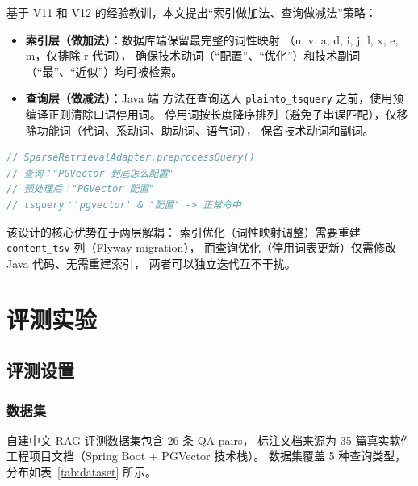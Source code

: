 \documentclass[a4paper, 12pt]{ctexart}
\begin{document}
基于 V11 和 V12 的经验教训，本文提出``索引做加法、查询做减法''策略：

\begin{itemize}
  \item \textbf{索引层（做加法）}：数据库端保留最完整的词性映射
  （n, v, a, d, i, j, l, x, e, m，仅排除 r 代词），
  确保技术动词（``配置''、``优化''）和技术副词（``最''、``近似''）均可被检索。

  \item \textbf{查询层（做减法）}：Java 端  方法在查询送入
  \texttt{plainto\_tsquery} 之前，使用预编译正则清除口语停用词。
  停用词按长度降序排列（避免子串误匹配），仅移除功能词（代词、系动词、助动词、语气词），
  保留技术动词和副词。
\end{itemize}

\begin{lstlisting}[language=Java]
// SparseRetrievalAdapter.preprocessQuery()
// 查询："PGVector 到底怎么配置"
// 预处理后："PGVector 配置"
// tsquery：'pgvector' & '配置' -> 正常命中
\end{lstlisting}

该设计的核心优势在于两层解耦：
索引优化（词性映射调整）需要重建 \texttt{content\_tsv} 列（Flyway migration），
而查询优化（停用词表更新）仅需修改 Java 代码、无需重建索引，
两者可以独立迭代互不干扰。

\section{评测实验}

\subsection{评测设置}

\subsubsection{数据集}

自建中文 RAG 评测数据集包含 26 条 QA pairs，
标注文档来源为 35 篇真实软件工程项目文档（Spring Boot + PGVector 技术栈）。
数据集覆盖 5 种查询类型，分布如表~\ref{tab:dataset} 所示。
\end{document}

